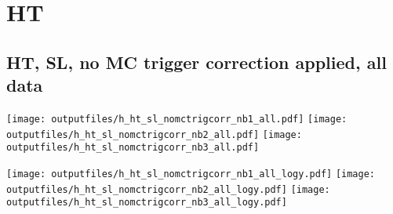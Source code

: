 \documentclass[11pt]{article}
\begin{document}













   \section{HT}
     \subsection{ HT, SL, no MC trigger correction applied, all data}

    \noindent
     \texttt{[image: outputfiles/h\_ht\_sl\_nomctrigcorr\_nb1\_all.pdf]}
     \texttt{[image: outputfiles/h\_ht\_sl\_nomctrigcorr\_nb2\_all.pdf]}
     \texttt{[image: outputfiles/h\_ht\_sl\_nomctrigcorr\_nb3\_all.pdf]}

    \noindent
     \texttt{[image: outputfiles/h\_ht\_sl\_nomctrigcorr\_nb1\_all\_logy.pdf]}
     \texttt{[image: outputfiles/h\_ht\_sl\_nomctrigcorr\_nb2\_all\_logy.pdf]}
     \texttt{[image: outputfiles/h\_ht\_sl\_nomctrigcorr\_nb3\_all\_logy.pdf]}
\end{document}
